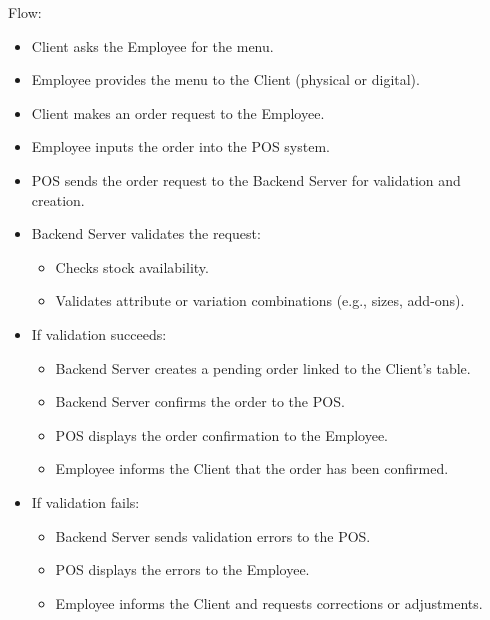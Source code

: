 \documentclass[]{VUMIFTemplateClass}
\begin{document}
Flow:
\begin{itemize}
\setlength{\itemsep}{2pt}
\setlength{\parskip}{0pt}
\setlength{\parsep}{0pt}
\item Client asks the Employee for the menu.
\item Employee provides the menu to the Client (physical or digital).
\item Client makes an order request to the Employee.
\item Employee inputs the order into the POS system.
\item POS sends the order request to the Backend Server for validation and creation.
\item Backend Server validates the request:
\begin{itemize}
\item Checks stock availability.
\item Validates attribute or variation combinations (e.g., sizes, add-ons).
\end{itemize}
\item If validation succeeds:
\begin{itemize}
\item Backend Server creates a pending order linked to the Client’s table.
\item Backend Server confirms the order to the POS.
\item POS displays the order confirmation to the Employee.
\item Employee informs the Client that the order has been confirmed.
\end{itemize}
\item If validation fails:
\begin{itemize}
\item Backend Server sends validation errors to the POS.
\item POS displays the errors to the Employee.
\item Employee informs the Client and requests corrections or adjustments.
\end{itemize}
\end{itemize}
\end{document}
